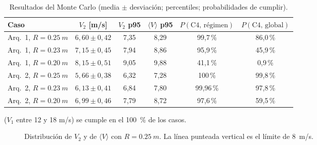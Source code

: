 \begin{table}[H]
\centering\small
\caption{Resultados del Monte Carlo (media $\pm$ desviación; percentiles; probabilidades de cumplir).}\label{tab:arq-mc}
\begin{tabular}{@{}lccccc@{}}
\toprule
\textbf{Caso} & $V_2$ [m/s] & $V_2$ p95 & $\langle V\rangle$ p95 & $P(\text{C4, régimen})$ & $P(\text{C4, global})$\\\midrule
Arq.~1, $R=\SI{0.25}{m}$ & $6{,}60\pm0{,}42$ & 7,35 & 8,29 & 99,7\,\% & 86,0\,\%\\
Arq.~1, $R=\SI{0.23}{m}$ & $7{,}15\pm0{,}45$ & 7,94 & 8,86 & 95,9\,\% & 45,9\,\%\\
Arq.~1, $R=\SI{0.20}{m}$ & $8{,}15\pm0{,}51$ & 9,05 & 9,88 & 41,1\,\% & 0,9\,\%\\
Arq.~2, $R=\SI{0.25}{m}$ & $5{,}66\pm0{,}38$ & 6,32 & 7,28 & 100\,\% & 99,8\,\%\\
Arq.~2, $R=\SI{0.23}{m}$ & $6{,}13\pm0{,}41$ & 6,84 & 7,80 & 99,96\,\% & 97,8\,\%\\
Arq.~2, $R=\SI{0.20}{m}$ & $6{,}99\pm0{,}46$ & 7,79 & 8,72 & 97,6\,\% & 59,5\,\%\\
\bottomrule
\end{tabular}
\end{table}
 ($V_1$ entre 12 y 18 m/s) se cumple en el \SI{100}{\percent} de los casos.

\begin{figure}[H]
\centering
{}
\caption{Distribución de $V_2$ y de $\langle V\rangle$ con $R=\SI{0.25}{m}$. La línea
punteada vertical es el límite de \SI{8}{m/s}.}
\label{fig:arq-hist}
\end{figure}


